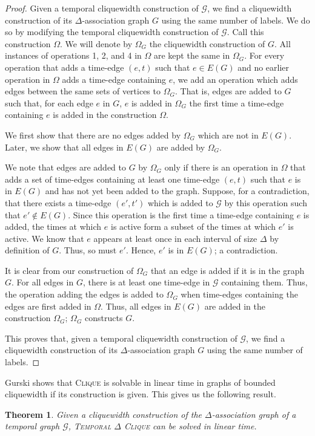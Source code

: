 \documentclass[preprint,12pt]{elsarticle}
\newtheorem{theorem}{Theorem}
\begin{document}
\begin{proof}
    Given a temporal cliquewidth construction of $\mathcal{G}$, we find a cliquewidth construction of its $\Delta$-association graph $G$ using the same number of labels. We do so by modifying the temporal cliquewidth construction of $\mathcal{G}$. Call this construction $\Omega$. We will denote by $\Omega_G$ the cliquewidth construction of $G$. All instances of operations 1, 2, and 4 in $\Omega$ are kept the same in $\Omega_G$. For every operation that adds a time-edge $(e,t)$ such that $e\in E(G)$ and no earlier operation in $\Omega$ adds a time-edge containing $e$, we add an operation which adds edges between the same sets of vertices to $\Omega_G$. That is, edges are added to $G$ such that, for each edge $e$ in $G$, $e$ is added in $\Omega_G$ the first time a time-edge containing $e$ is added in the construction $\Omega$. 

    We first show that there are no edges added by $\Omega_G$ which are not in $E(G)$. Later, we show that all edges in $E(G)$ are added by $\Omega_G$.

     We note that edges are added to $G$ by $\Omega_G$ only if there is an operation in $\Omega$ that adds a set of time-edges containing at least one time-edge $(e,t)$ such that $e$ is in $E(G)$ and has not yet been added to the graph. Suppose, for a contradiction, that there exists a time-edge $(e',t')$ which is added to $\mathcal{G}$ by this operation such that $e'\notin E(G)$. Since this operation is the first time a time-edge containing $e$ is added, the times at which $e$ is active form a subset of the times at which $e'$ is active. We know that $e$ appears at least once in each interval of size $\Delta$ by definition of $G$. Thus, so must $e'$. Hence, $e'$ is in $E(G)$; a contradiction.

     It is clear from our construction of $\Omega_G$ that an edge is added if it is in the graph $G$. For all edges in $G$, there is at least one time-edge in $\mathcal{G}$ containing them. Thus, the operation adding the edges is added to $\Omega_G$ when time-edges containing the edges are first added in $\Omega$. Thus, all edges in $E(G)$ are added in the construction $\Omega_G$; $\Omega_G$ constructs $G$. 
     
    This proves that, given a temporal cliquewidth construction of $\mathcal{G}$, we find a cliquewidth construction of its $\Delta$-association graph $G$ using the same number of labels. 
\end{proof}
Gurski \cite[Theorem 4.4]{gurski_comparison_2008} shows that \textsc{Clique} is solvable in linear time in graphs of bounded cliquewidth if its construction is given. This gives us the following result.
\begin{theorem}
    Given a cliquewidth construction of the $\Delta$-association graph of a temporal graph $\mathcal{G}$, \textsc{Temporal $\Delta$ Clique} can be solved in linear time.
\end{theorem}
\end{document}
